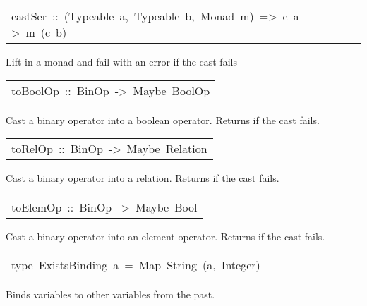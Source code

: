 \begin{haddockdesc}
\item[\begin{tabular}{@{}l}
castSer\ ::\ (Typeable\ a,\ Typeable\ b,\ Monad\ m)\ =>\ c\ a\ ->\ m\ (c\ b)
\end{tabular}]\haddockbegindoc
Lift  in a monad and fail with an error if the cast fails
\par

\end{haddockdesc}
\begin{haddockdesc}
\item[\begin{tabular}{@{}l}
toBoolOp\ ::\ BinOp\ ->\ Maybe\ BoolOp
\end{tabular}]\haddockbegindoc
Cast a binary operator into a boolean operator. Returns  if the cast fails.
\par

\end{haddockdesc}
\begin{haddockdesc}
\item[\begin{tabular}{@{}l}
toRelOp\ ::\ BinOp\ ->\ Maybe\ Relation
\end{tabular}]\haddockbegindoc
Cast a binary operator into a relation. Returns  if the cast fails.
\par

\end{haddockdesc}
\begin{haddockdesc}
\item[\begin{tabular}{@{}l}
toElemOp\ ::\ BinOp\ ->\ Maybe\ Bool
\end{tabular}]\haddockbegindoc
Cast a binary operator into an element operator. Returns  if the cast fails.
\par

\end{haddockdesc}
\begin{haddockdesc}
\item[\begin{tabular}{@{}l}
type\ ExistsBinding\ a\ =\ Map\ String\ (a,\ Integer)
\end{tabular}]\haddockbegindoc
Binds variables to other variables from the past.
\par

\end{haddockdesc}
